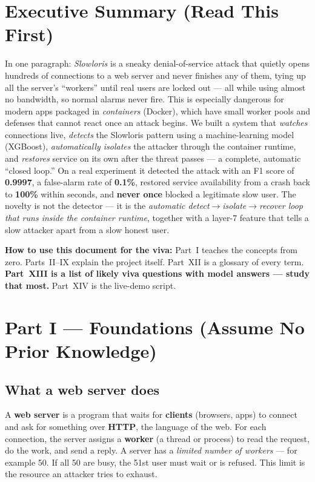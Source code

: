 \documentclass[11pt,a4paper]{article}
\newcommand{\term}[1]{\textbf{#1}}
\begin{document}
\section{Executive Summary (Read This First)}
In one paragraph: \emph{Slowloris} is a sneaky denial-of-service attack that
quietly opens hundreds of connections to a web server and never finishes any of
them, tying up all the server's ``workers'' until real users are locked out ---
all while using almost no bandwidth, so normal alarms never fire. This is
especially dangerous for modern apps packaged in \emph{containers} (Docker), which
have small worker pools and defenses that cannot react once an attack begins. We
built a system that \emph{watches} connections live, \emph{detects} the Slowloris
pattern using a machine-learning model (XGBoost), \emph{automatically isolates}
the attacker through the container runtime, and \emph{restores} service on its own
after the threat passes --- a complete, automatic ``closed loop.'' On a real
experiment it detected the attack with an F1 score of \textbf{0.9997}, a
false-alarm rate of \textbf{0.1\%}, restored service availability from a crash
back to \textbf{100\%} within seconds, and \textbf{never once} blocked a
legitimate slow user. The novelty is not the detector --- it is the \emph{automatic
detect$\rightarrow$isolate$\rightarrow$recover loop that runs inside the container
runtime}, together with a layer-7 feature that tells a slow attacker apart from a
slow honest user.

\textbf{How to use this document for the viva:} Part~I teaches the concepts from
zero. Parts~II--IX explain the project itself. Part~XII is a glossary of every
term. \textbf{Part~XIII is a list of likely viva questions with model answers ---
study that most.} Part~XIV is the live-demo script.

\section{Part I --- Foundations (Assume No Prior Knowledge)}

\subsection{What a web server does}
A \term{web server} is a program that waits for \term{clients} (browsers, apps) to
connect and ask for something over \term{HTTP}, the language of the web. For each
connection, the server assigns a \term{worker} (a thread or process) to read the
request, do the work, and send a reply. A server has a \emph{limited number of
workers} --- for example 50. If all 50 are busy, the 51st user must wait or is
refused. This limit is the resource an attacker tries to exhaust.
\end{document}
